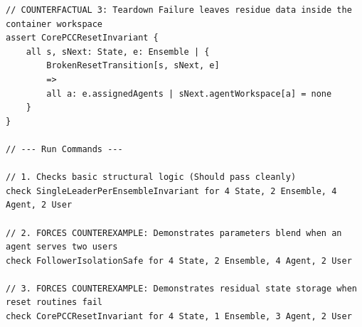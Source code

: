 \begin{lstlisting}[language=Alloy, caption={Complete Multi-Agent \& Isolation Architecture Verification Script}]
// COUNTERFACTUAL 3: Teardown Failure leaves residue data inside the container workspace
assert CorePCCResetInvariant {
    all s, sNext: State, e: Ensemble | {
        BrokenResetTransition[s, sNext, e]
        => 
        all a: e.assignedAgents | sNext.agentWorkspace[a] = none
    }
}

// --- Run Commands ---

// 1. Checks basic structural logic (Should pass cleanly)
check SingleLeaderPerEnsembleInvariant for 4 State, 2 Ensemble, 4 Agent, 2 User

// 2. FORCES COUNTEREXAMPLE: Demonstrates parameters blend when an agent serves two users
check FollowerIsolationSafe for 4 State, 2 Ensemble, 4 Agent, 2 User

// 3. FORCES COUNTEREXAMPLE: Demonstrates residual state storage when reset routines fail
check CorePCCResetInvariant for 4 State, 1 Ensemble, 3 Agent, 2 User
\end{lstlisting}

